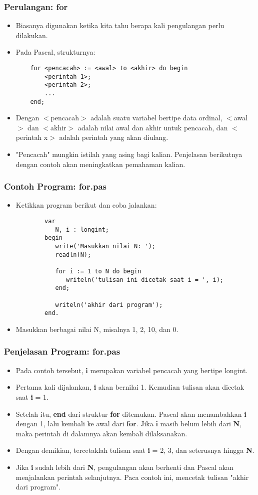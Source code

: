 \documentclass{beamer}
\begin{document}
\begin{frame}[fragile]
\frametitle{Perulangan: for}
\begin{itemize}
	\item Biasanya digunakan ketika kita tahu berapa kali pengulangan perlu dilakukan.
	\item Pada Pascal, strukturnya:
	\begin{lstlisting}
	for <pencacah> := <awal> to <akhir> do begin
	    <perintah 1>;
	    <perintah 2>;
	    ...
	end;
	\end{lstlisting}
	\item Dengan $<$pencacah$>$ adalah suatu variabel bertipe data \alert{ordinal}, $<$awal$>$ dan $<$akhir$>$ adalah nilai awal dan akhir untuk pencacah, dan $<$perintah x$>$ adalah perintah yang akan diulang.
	\item "Pencacah" mungkin istilah yang asing bagi kalian. Penjelasan berikutnya dengan contoh akan meningkatkan pemahaman kalian.
\end{itemize}
\end{frame}

\begin{frame}[fragile]
\frametitle{Contoh Program: for.pas}
\begin{itemize}
	\item Ketikkan program berikut dan coba jalankan:
	\begin{lstlisting}
		var
		   N, i : longint;
		begin
		   write('Masukkan nilai N: ');
		   readln(N);
		
		   for i := 1 to N do begin
		      writeln('tulisan ini dicetak saat i = ', i);
		   end;
		   
		   writeln('akhir dari program');
		end.
	\end{lstlisting}
	\item Masukkan berbagai nilai N, misalnya 1, 2, 10, dan 0.
\end{itemize}
\end{frame}

\begin{frame}
\frametitle{Penjelasan Program: for.pas}
\begin{itemize}
	\item Pada contoh tersebut, \textbf{i} merupakan variabel pencacah yang bertipe longint.
	\item Pertama kali dijalankan, \textbf{i} akan bernilai 1. Kemudian tulisan akan dicetak saat \textbf{i} = 1.
	\item Setelah itu, \textbf{end} dari struktur \textbf{for} ditemukan. Pascal akan menambahkan \textbf{i} dengan 1, lalu kembali ke awal dari \textbf{for}. Jika \textbf{i} masih belum lebih dari \textbf{N}, maka perintah di dalamnya akan kembali dilaksanakan.
	\item Dengan demikian, tercetaklah tulisan saat \textbf{i} = 2, 3, dan seterusnya hingga \textbf{N}.
	\item Jika \textbf{i} sudah lebih dari \textbf{N}, pengulangan akan berhenti dan Pascal akan menjalankan perintah selanjutnya. Paca contoh ini, mencetak tulisan "akhir dari program".
\end{itemize}
\end{frame}
\end{document}
